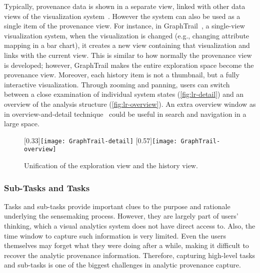 Typically, provenance data is shown in a separate view, linked with other data views of the visualization system~\cite{Shrinivasan2008,Heer2008,Pike2009,Kadivar2009}. However the system can also be used as a single item of the provenance view. For instance, in GraphTrail~\cite{Dunne2012}, a single-view visualization system, when the visualization is changed (e.g., changing attribute mapping in a bar chart), it creates a new view containing that visualization and links with the current view. This is similar to how normally the provenance view is developed; however, GraphTrail makes the entire exploration space become the provenance view. Moreover, each history item is not a thumbnail, but a fully interactive visualization. Through zooming and panning, users can switch between a close examination of individual system states (\autoref{fig:lr-detail}) and an overview of the analysis structure (\autoref{fig:lr-overview}). An extra overview window as in overview-and-detail technique~\cite{Cockburn2008} could be useful in search and navigation in a large space.

\begin{figure}
\centering
{}[0.33\columnwidth]{\texttt{[image: GraphTrail-detail]}}
\hfill
{}[0.57\columnwidth]{\texttt{[image: GraphTrail-overview]}}
\caption[Unification of the exploration view and the history view]{Unification of the exploration view and the history view. }
\end{figure}

\subsubsection{Sub-Tasks and Tasks}
Tasks and sub-tasks provide important clues to the purpose and rationale underlying the sensemaking process. However, they are largely part of users' thinking, which a visual analytics system does not have direct access to. Also, the time window to capture such information is very limited. Even the users themselves may forget what they were doing after a while, making it difficult to recover the analytic provenance information. Therefore, capturing high-level tasks and sub-tasks is one of the biggest challenges in analytic provenance capture.

